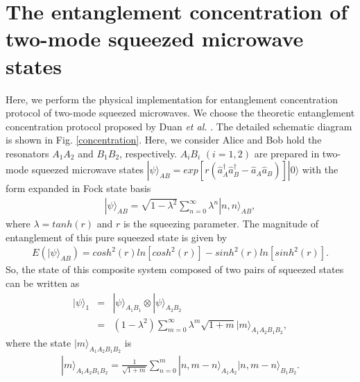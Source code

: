 \documentclass[preprintnumbers,showkeys,amsmath,amssymb]{revtex4}%
\begin{document}
\section{The entanglement concentration of two-mode squeezed microwave states} \label{sec3}

Here, we perform the physical implementation for entanglement
concentration protocol of two-mode squeezed microwaves. We choose
the theoretic entanglement concentration protocol proposed by Duan
\emph{et al.} \cite{LMDuanPRL2000}. The detailed schematic diagram
is shown in Fig. \ref{concentration}. Here, we consider Alice and
Bob hold the resonators $A_{1}A_{2}$ and $B_{1}B_{2}$, respectively.
$A_{i}B_{i}$ $(i=1,2)$ are prepared in two-mode squeezed microwave
states
$|\psi\rangle_{AB}=exp[r(\hat{a}^{\dag}_{A}\hat{a}^{\dag}_{B}-\hat{a}_{A}\hat{a}_{B})]|0\rangle$
with the form expanded in Fock state basis
\begin{eqnarray}    \label{squeezed}
|\psi\rangle_{AB}=\sqrt{1-\lambda^{2}}\sum^{\infty}_{n=0}\lambda^{n}|n,n\rangle_{AB},
\end{eqnarray}
where $\lambda=tanh(r)$  and $r$ is the squeezing parameter. The
magnitude of entanglement of this pure squeezed state is given by
\begin{eqnarray}    \label{entanglesqueezed}
E(|\psi\rangle_{AB})\!=\!cosh^{2}(r)ln[cosh^{2}(r)]\!-\!sinh^{2}(r)ln[sinh^{2}(r)].
\end{eqnarray}
So, the state of this composite system composed of two pairs of
squeezed states can be written as \cite{LMDuanPRA2000}
\begin{eqnarray}    \label{squeezed}
|\psi\rangle_{1}&=&|\psi\rangle_{\!A_{1}\!B_{1}}\otimes|\psi\rangle_{\!A_{2}\!B_{2}}\nonumber\\
&=&(1-\lambda^{2})\sum^{\infty}_{m=0}\lambda^{m}\sqrt{1+m}|m\rangle_{\!A_{1}\!A_{2}\!B_{1}\!B_{2}},
\end{eqnarray}
where the state $|m\rangle_{\!A_{1}\!A_{2}\!B_{1}\!B_{2}}$ is
\begin{eqnarray}    \label{}
|m\rangle_{\!A_{1}\!A_{2}\!B_{1}\!B_{2}}\!=\!\frac{1}{\sqrt{1\!+\!m}}\!\sum^{m}_{n=0}\!|n,m\!-\!n\rangle_{\!A_{1}\!A_{2}}|n,m\!-\!n\rangle_{\!B_{1}\!B_{2}}.
\end{eqnarray}
\end{document}
